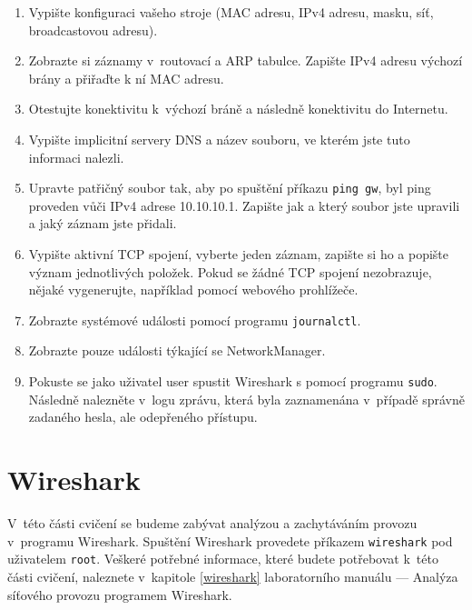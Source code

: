 \begin{enumerate}
\item Vypište konfiguraci vašeho stroje (MAC adresu, IPv4 adresu, masku, síť, broadcastovou adresu).
\item Zobrazte si záznamy v~routovací a ARP tabulce. Zapište IPv4 adresu výchozí brány a přiřaďte k ní MAC adresu.
\item Otestujte konektivitu k~výchozí bráně a následně konektivitu do Internetu.
\item Vypište implicitní servery DNS a název souboru, ve kterém jste tuto informaci nalezli.
\item Upravte patřičný soubor tak, aby po spuštění příkazu \texttt{ping gw}, byl ping proveden vůči IPv4 adrese 10.10.10.1. Zapište jak a který soubor jste upravili a jaký záznam jste přidali.
\item Vypište aktivní TCP spojení, vyberte jeden záznam, zapište si ho a popište význam jednotlivých položek. Pokud se žádné TCP spojení nezobrazuje, nějaké vygenerujte, například pomocí webového prohlížeče.
\item Zobrazte systémové události pomocí programu \texttt{journalctl}.
\item Zobrazte pouze události týkající se NetworkManager.
\item Pokuste se jako uživatel user spustit Wireshark s pomocí programu \texttt{sudo}. Následně nalezněte v~logu zprávu, která byla zaznamenána v~případě správně zadaného hesla, ale odepřeného přístupu.
\end{enumerate}

\section{Wireshark}
V~této části cvičení se budeme zabývat analýzou a zachytáváním provozu
v~programu Wireshark. Spuštění Wireshark provedete příkazem \texttt{wireshark}
pod uživatelem \texttt{root}. Veškeré potřebné informace, které budete
potřebovat k~této části cvičení, naleznete v~kapitole \ref{wireshark} laboratorního manuálu
--- Analýza síťového provozu programem Wireshark.

